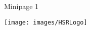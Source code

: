 \begin{minipage}[h]{3cm}
  Minipage 1
\end{minipage}
\begin{minipage}[h]{3cm}
  \texttt{[image: images/HSRLogo]}
\end{minipage}